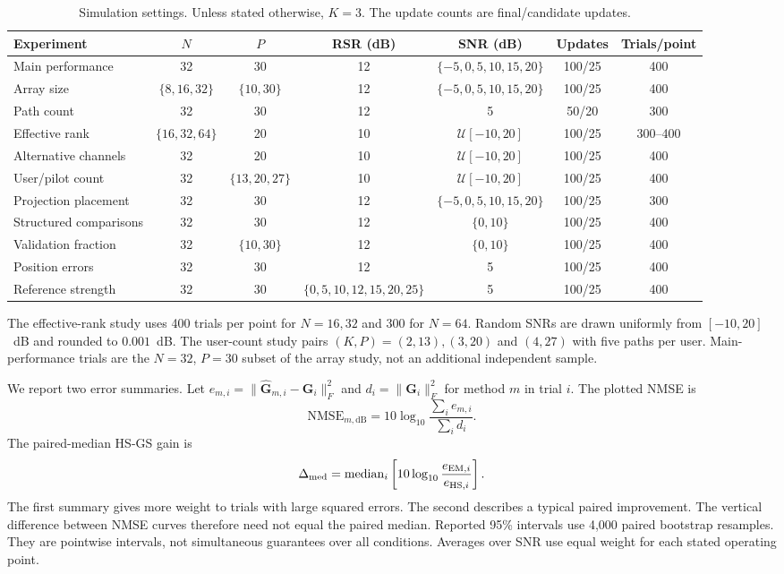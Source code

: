\documentclass[journal]{IEEEtran}
\begin{document}
\begin{table}[!t]
\caption{Simulation settings. Unless stated otherwise, $K=3$.
The update counts are final/candidate updates.}
\label{tab:config}
\centering
\footnotesize
\setlength{\tabcolsep}{5pt}
\begin{tabular}{lcccccc}
\toprule
Experiment & $N$ & $P$ & RSR (dB) & SNR (dB) & Updates & Trials/point\\
\midrule
Main performance & 32 & 30 & 12 & $\{-5,0,5,10,15,20\}$ & 100/25 & 400\\
Array size & $\{8,16,32\}$ & $\{10,30\}$ & 12 & $\{-5,0,5,10,15,20\}$ & 100/25 & 400\\
Path count & 32 & 30 & 12 & 5 & 50/20 & 300\\
Effective rank & $\{16,32,64\}$ & 20 & 10 & $\mathcal U[-10,20]$ & 100/25 & 300--400\\
Alternative channels & 32 & 20 & 10 & $\mathcal U[-10,20]$ & 100/25 & 400\\
User/pilot count & 32 & $\{13,20,27\}$ & 10 & $\mathcal U[-10,20]$ & 100/25 & 400\\
Projection placement & 32 & 30 & 12 & $\{-5,0,5,10,15,20\}$ & 100/25 & 300\\
Structured comparisons & 32 & 30 & 12 & $\{0,10\}$ & 100/25 & 400\\
Validation fraction & 32 & $\{10,30\}$ & 12 & $\{0,10\}$ & 100/25 & 400\\
Position errors & 32 & 30 & 12 & 5 & 100/25 & 400\\
Reference strength & 32 & 30 & $\{0,5,10,12,15,20,25\}$ & 5 & 100/25 & 400\\
\bottomrule
\end{tabular}
\end{table}

The effective-rank study uses 400 trials per point for $N=16,32$ and
300 for $N=64$. Random SNRs are drawn uniformly from $[-10,20]$~dB and
rounded to $0.001$~dB. The user-count study pairs $(K,P)=(2,13),(3,20)$
and $(4,27)$ with five paths per user. Main-performance trials are the
$N=32$, $P=30$ subset of the array study, not an additional independent
sample.

We report two error summaries. Let
$e_{m,i}=\|\widehat{\mathbf G}_{m,i}-\mathbf G_i\|_F^2$ and
$d_i=\|\mathbf G_i\|_F^2$ for method $m$ in trial $i$. The plotted NMSE is
\begin{equation}
\mathrm{NMSE}_{m,\mathrm{dB}}
=10\log_{10}\frac{\sum_i e_{m,i}}{\sum_i d_i}.
\label{eq:nmse-summary}
\end{equation}
The paired-median HS-GS gain is
\begin{equation}
\Delta_{\rm med}=\operatorname{median}_i
 \left[10\log_{10}\frac{e_{{\rm EM},i}}{e_{{\rm HS},i}}\right].
\end{equation}
The first summary gives more weight to trials with large squared errors.
The second describes a typical paired improvement. The vertical difference
between NMSE curves therefore need not equal the paired median. Reported
95\% intervals use 4,000 paired bootstrap resamples. They are pointwise
intervals, not simultaneous guarantees over all conditions. Averages over
SNR use equal weight for each stated operating point.
\end{document}
